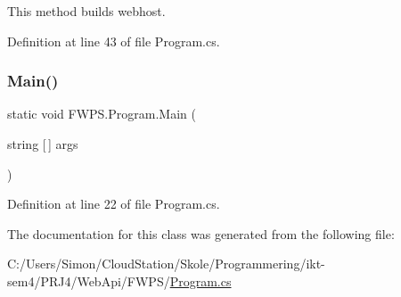This method builds webhost. 



Definition at line 43 of file Program.\+cs.

\mbox{\label{class_f_w_p_s_1_1_program_a206ed562ef064d331e9d98f52cfb9659}} 
\subsubsection{\texorpdfstring{Main()}{Main()}}
{\footnotesize\ttfamily static void F\+W\+P\+S.\+Program.\+Main (\begin{DoxyParamCaption}\item[{string \mbox{[}$\,$\mbox{]}}]{args }\end{DoxyParamCaption})\hspace{0.3cm}{\ttfamily [static]}}



Definition at line 22 of file Program.\+cs.



The documentation for this class was generated from the following file\+:\begin{DoxyCompactItemize}
\item 
C\+:/\+Users/\+Simon/\+Cloud\+Station/\+Skole/\+Programmering/ikt-\/sem4/\+P\+R\+J4/\+Web\+Api/\+F\+W\+P\+S/\mbox{\hyperlink{_web_api_2_f_w_p_s_2_program_8cs}{Program.\+cs}}\end{DoxyCompactItemize}
